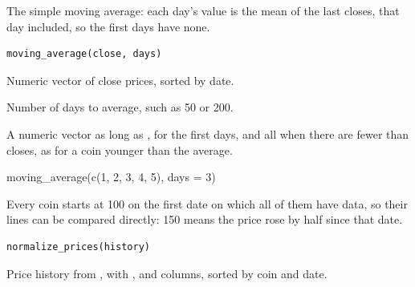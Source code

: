 \documentclass[a4paper]{book}
\begin{document}
%
\begin{Description}
The simple moving average: each day's value is the mean of the last
 closes, that day included, so the first  days have none.
\end{Description}
%
\begin{Usage}
\begin{verbatim}
moving_average(close, days)
\end{verbatim}
\end{Usage}
%
\begin{Arguments}
\begin{ldescription}
\item[\code{close}] Numeric vector of close prices, sorted by date.

\item[\code{days}] Number of days to average, such as 50 or 200.
\end{ldescription}
\end{Arguments}
%
\begin{Value}
A numeric vector as long as ,  for the first
 days, and all  when there are fewer than  closes,
as for a coin younger than the average.
\end{Value}
%
\begin{Examples}
\begin{ExampleCode}
moving_average(c(1, 2, 3, 4, 5), days = 3)
\end{ExampleCode}
\end{Examples}
%
\begin{Description}
Every coin starts at 100 on the first date on which all of them have data,
so their lines can be compared directly: 150 means the price rose by half
since that date.
\end{Description}
%
\begin{Usage}
\begin{verbatim}
normalize_prices(history)
\end{verbatim}
\end{Usage}
%
\begin{Arguments}
\begin{ldescription}
\item[\code{history}] Price history from , with ,
 and  columns, sorted by coin and date.
\end{ldescription}
\end{Arguments}
\end{document}
